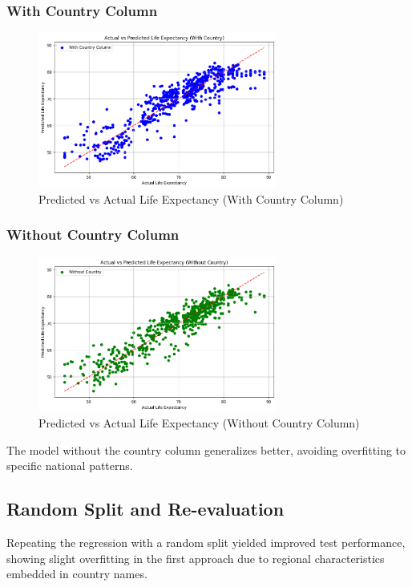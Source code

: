 \documentclass[11pt]{article}
\begin{document}
\subsubsection*{With Country Column}
\begin{figure}[H]
    \centering
    \includegraphics[width=0.7\textwidth]{output4.png}
    \caption{Predicted vs Actual Life Expectancy (With Country Column)}
\end{figure}

\subsubsection*{Without Country Column}
\begin{figure}[H]
    \centering
    \includegraphics[width=0.7\textwidth]{output5.png}
    \caption{Predicted vs Actual Life Expectancy (Without Country Column)}
\end{figure}

\noindent The model without the country column generalizes better, avoiding overfitting to specific national patterns.

\subsection{Random Split and Re-evaluation}
Repeating the regression with a random split yielded improved test performance, showing slight overfitting in the first approach due to regional characteristics embedded in country names.
\end{document}
